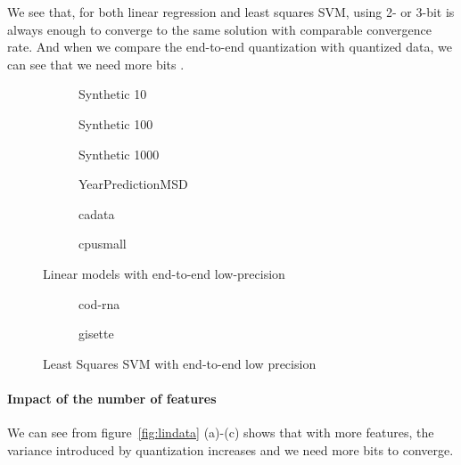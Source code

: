 \documentclass{article}
\begin{document}
We see that, for both linear regression 
and least squares SVM,
using 2- or 3-bit is always enough
to converge to the same solution
with comparable convergence rate. 
And when we compare the end-to-end quantization
with quantized data, we can see that we
need more bits . 
\begin{figure}[t]
\centering

    \begin{subfigure}[h]{.3\columnwidth}
    \caption{Synthetic 10}
    \end{subfigure}
    \begin{subfigure}[h]{.3\columnwidth}
    \caption{Synthetic 100}
    \end{subfigure}
    \begin{subfigure}[h]{.3\columnwidth}
     \caption{Synthetic 1000}
    \end{subfigure}
    
    \begin{subfigure}[h]{.3\columnwidth}
    \caption{YearPredictionMSD}
    \end{subfigure}
    \begin{subfigure}[h]{.3\columnwidth}
    \caption{cadata}
    \end{subfigure}
    \begin{subfigure}[h]{.3\columnwidth}
     \caption{cpusmall}
    \end{subfigure}
    
\caption{Linear models with end-to-end low-precision}
\label{fig:linendtoend}
\end{figure}


\begin{figure}[t]
\centering
    \begin{subfigure}[h]{.4\columnwidth}
    \caption{cod-rna}
    \end{subfigure}
    \begin{subfigure}[h]{.4\columnwidth}
    \caption{gisette}
    \end{subfigure}
    
\caption{Least Squares SVM with end-to-end low precision}
\label{fig:lssvmendtoend}
\end{figure}

\paragraph{Impact of the number of features}
We can see from figure~\ref{fig:lindata} (a)-(c) shows that with more features, the variance introduced by quantization increases and we need more bits to converge.
\end{document}
